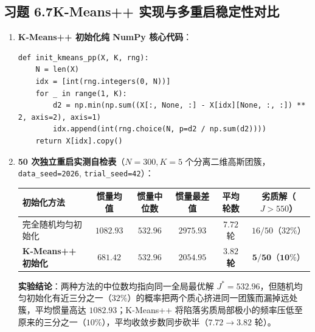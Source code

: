 \subsection*{习题 6.7\quad K-Means++ 实现与多重启稳定性对比}
\begin{enumerate}[label=(\arabic*), leftmargin=1.8em]
  \item \textbf{K-Means++ 初始化纯 NumPy 核心代码}：
  \begin{lstlisting}
def init_kmeans_pp(X, K, rng):
    N = len(X)
    idx = [int(rng.integers(0, N))]
    for _ in range(1, K):
        d2 = np.min(np.sum((X[:, None, :] - X[idx][None, :, :]) ** 2, axis=2), axis=1)
        idx.append(int(rng.choice(N, p=d2 / np.sum(d2))))
    return X[idx].copy()
  \end{lstlisting}
  \item \textbf{50 次独立重启实测自检表}（$N=300, K=5$ 个分离二维高斯团簇，\texttt{data\_seed=2026}, \texttt{trial\_seed=42}）：
  \begin{center}\footnotesize\setlength{\tabcolsep}{4pt}
  \begin{tabular}{@{}lccccc@{}}
    \toprule
    \textbf{初始化方法} & 惯量均值 & 惯量中位数 & 惯量最差值 & 平均轮数 & 劣质解（$J>550$） \\
    \midrule
    完全随机均匀初始化 & $1082.93$ & $532.96$ & $2975.93$ & $7.72$ 轮 & $16 / 50$（$32\%$） \\
    \textbf{K-Means++ 初始化} & $\mathbf{681.42}$ & $\mathbf{532.96}$ & $\mathbf{2054.95}$ & $\mathbf{3.82}$ \textbf{轮} & $\mathbf{5 / 50}$（$\mathbf{10\%}$） \\
    \bottomrule
  \end{tabular}
  \end{center}
  \textbf{实验结论}：两种方法的中位数均指向同一全局最优解 $J^* = 532.96$，但随机均匀初始化有近三分之一（$32\%$）的概率把两个质心挤进同一团簇而漏掉远处簇，平均惯量高达 $1082.93$；K-Means++ 将陷落劣质局部极小的频率压低至原来的三分之一（$10\%$），平均收敛步数同步砍半（$7.72 \to 3.82$ 轮）。
\end{enumerate}

